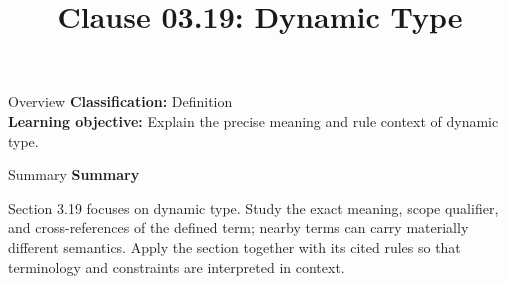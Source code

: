 \documentclass[10pt,letterpaper]{article}
\title{Clause 03.19: Dynamic Type}
\author{}
\date{}
\begin{document}
\maketitle
\begin{CornellOverviewBox}{Overview}
\textbf{Classification:} Definition\\[2pt]
\textbf{Learning objective:} Explain the precise meaning and rule context of dynamic type.
\end{CornellOverviewBox}\begin{CornellSummaryBox}{Summary}
{\sffamily\bfseries\color{Accent} Summary}\par\vspace{3pt}Section 3.19 focuses on dynamic type. Study the exact meaning, scope qualifier, and cross-references of the defined term; nearby terms can carry materially different semantics. Apply the section together with its cited rules so that terminology and constraints are interpreted in context.
\end{CornellSummaryBox}
\end{document}

